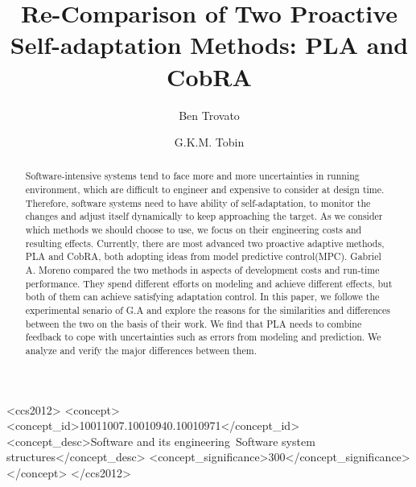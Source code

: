 \documentclass[sigconf]{acmart}
\begin{document}
\title{Re-Comparison of Two Proactive Self-adaptation Methods: PLA and CobRA}


\author{Ben Trovato}
\author{G.K.M. Tobin}
\authornotemark[1]

\author{}

\author{}
%
%

\begin{abstract}
Software-intensive systems tend to face more and more uncertainties in running environment, which are difficult to engineer and expensive to consider at design time. Therefore, software systems need to have ability of self-adaptation, to monitor the changes and adjust itself dynamically to keep approaching the target. As we consider which methods we should choose to use, we focus on their engineering costs and resulting effects. Currently, there are most advanced two proactive adaptive methods, PLA\cite{pla} and CobRA\cite{cobra}, both adopting ideas from model predictive control(MPC). Gabriel A. Moreno compared the two methods in aspects of development costs and run-time performance\cite{GA}. They spend different efforts on modeling and achieve different effects, but both of them can achieve satisfying adaptation control. In this paper, we followe the experimental senario of G.A and explore the reasons for the similarities and differences between the two on the basis of their work. We find that PLA needs to combine feedback to cope with uncertainties such as errors from modeling and prediction. We analyze and verify the major differences between them.
\end{abstract}

\begin{CCSXML}
	<ccs2012>
	<concept>
	<concept_id>10011007.10010940.10010971</concept_id>
	<concept_desc>Software and its engineering~Software system structures</concept_desc>
	<concept_significance>300</concept_significance>
	</concept>
	</ccs2012>
\end{CCSXML}
\end{document}
